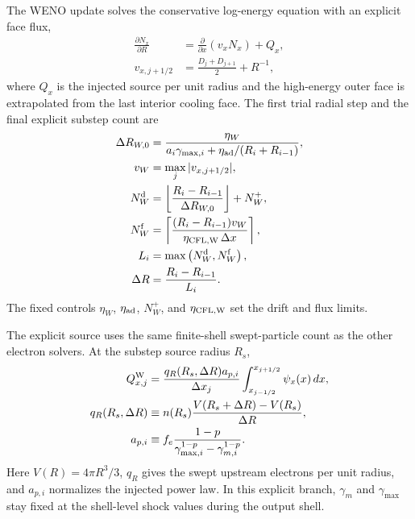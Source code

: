 \documentclass[twocolumn]{aastex702}
\begin{document}
The WENO update solves the conservative log-energy equation with an explicit
face flux,
\begin{equation}
\begin{aligned}
\frac{\partial N_x}{\partial R}
&=\frac{\partial}{\partial x}\left(v_xN_x\right)+Q_x,\\
v_{x,j+1/2}
&=
\frac{D_j+D_{j+1}}{2}+R^{-1},
\end{aligned}
\end{equation}
where \(Q_x\) is the injected source per unit radius and the high-energy outer
face is extrapolated from the last interior cooling face.  The first trial
radial step and the final explicit substep count are
\begin{equation}
\begin{aligned}
\Delta R_{W,0}&=
\frac{\eta_W}
{a_i\gamma_{\max,i}+\eta_{\rm ad}/(R_i+R_{i-1})},\\
v_W&=\max_j|v_{x,j+1/2}|,\\
N_W^{\rm d}&=\left\lfloor
\frac{R_i-R_{i-1}}{\Delta R_{W,0}}
\right\rfloor+N_W^+,\\
N_W^{\rm f}&=\left\lceil
\frac{(R_i-R_{i-1})v_W}
{\eta_{\rm CFL,W}\,\Delta x}
\right\rceil,\\
L_i&=\max\left(N_W^{\rm d},N_W^{\rm f}\right),\\
\Delta R&=\frac{R_i-R_{i-1}}{L_i}.
\end{aligned}
\end{equation}
The fixed controls \(\eta_W\), \(\eta_{\rm ad}\), \(N_W^+\), and
\(\eta_{\rm CFL,W}\) set the drift and flux limits.

The explicit source uses the same finite-shell swept-particle count as the other
electron solvers.  At the substep source radius \(R_s\),
\begin{equation}
\begin{aligned}
Q_{x,j}^{\rm W}&=
\frac{q_R(R_s,\Delta R)a_{p,i}}{\Delta x_j}
\int_{x_{j-1/2}}^{x_{j+1/2}}
\psi_x(x)\,dx,\\
q_R(R_s,\Delta R)&\equiv
n(R_s)\frac{V(R_s+\Delta R)-V(R_s)}{\Delta R},\\
a_{p,i}&\equiv
f_e\frac{1-p}{\gamma_{\max,i}^{1-p}-\gamma_{m,i}^{1-p}} .
\end{aligned}
\end{equation}
Here \(V(R)=4\pi R^3/3\), \(q_R\) gives the swept upstream electrons per unit
radius, and \(a_{p,i}\) normalizes the injected power law.  In this explicit
branch, \(\gamma_m\) and \(\gamma_{\max}\) stay fixed at the shell-level shock
values during the output shell.
\end{document}
